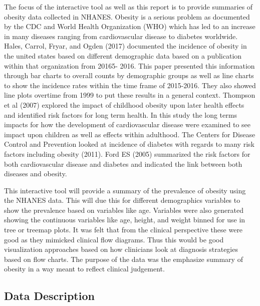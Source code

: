 \documentclass[12pt]{article}
\numberwithin{figure}{section}
\begin{document}
The focus of the interactive tool as well as this report is to provide summaries of obesity data collected in NHANES.  Obesity is a serious problem as documented by the CDC and World Health Organization (WHO) which has led to an increase in many diseases ranging from cardiovascular disease to diabetes worldwide.  Hales, Carrol, Fryar, and Ogden (2017) documented the incidence of obesity in the united states based on different demographic data based on a publication within that organization from 20165- 2016.  This paper presented this information through bar charts to overall counts by demographic groups as well as line charts to show the incidence rates within the time frame of 2015-2016. They also showed line plots overtime from 1999 to put these results in a general context.  Thompson et al (2007) explored the impact of childhood obesity upon later health effects and identified risk factors for long term health.  In this study the long terms impacts for how the development of cardiovascular disease were examined to see impact upon children as well as effects within adulthood.  The Centers for Disease Control and Prevention looked at incidence of diabetes with regards to many risk factors including obesity (2011).  Ford ES (2005) summarized the risk factors for both cardiovascular disease and diabetes and indicated the link between both diseases and obesity.

This interactive tool will provide a summary of the prevalence of obesity using the NHANES data.  This will due this for different demographics variables to show the prevalence based on variables like age.  Variables were also generated showing the continuous variables like age, height, and weight binned for use in tree or treemap plots.  It was felt that from the clinical perspective these were good as they mimicked clinical flow diagrams.  Thus this would be good visualization approaches based on how clinicians look at diagnosis strategies based on flow charts.  The purpose of the data was the emphasize summary of obesity in a way meant to reflect clinical judgement.


\vspace{5 mm}

{\subsection {Data Description}}
\end{document}
